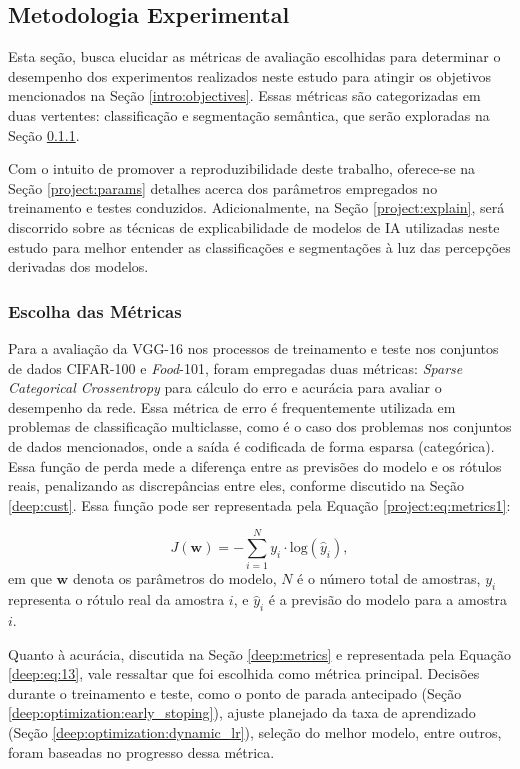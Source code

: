 \subsection{Metodologia Experimental}
\label{project:exp_result}
Esta seção, busca elucidar as métricas de avaliação escolhidas para determinar o desempenho dos experimentos realizados neste estudo para atingir os objetivos mencionados na Seção \ref{intro:objectives}. Essas métricas são categorizadas em duas vertentes: classificação e segmentação semântica, que serão exploradas na Seção \ref{project:metrics}.

Com o intuito de promover a reproduzibilidade deste trabalho, oferece-se na Seção \ref{project:params} detalhes acerca dos parâmetros empregados no treinamento e testes conduzidos. Adicionalmente, na Seção \ref{project:explain}, será discorrido sobre as técnicas de explicabilidade de modelos de IA utilizadas neste estudo para melhor entender as classificações e segmentações à luz das percepções derivadas dos modelos.

\subsubsection{Escolha das Métricas}
\label{project:metrics}
Para a avaliação da VGG-16 nos processos de treinamento e teste nos conjuntos de dados CIFAR-100 e \textit{Food}-101, foram empregadas duas métricas: \textit{Sparse Categorical Crossentropy} para cálculo do erro e acurácia para avaliar o desempenho da rede. Essa métrica de erro é frequentemente utilizada em problemas de classificação multiclasse, como é o caso dos problemas nos conjuntos de dados mencionados, onde a saída é codificada de forma esparsa (categórica). Essa função de perda mede a diferença entre as previsões do modelo e os rótulos reais, penalizando as discrepâncias entre eles, conforme discutido na Seção \ref{deep:cust}. Essa função pode ser representada pela Equação \ref{project:eq:metrics1}:

\begin{equation}
    \label{project:eq:metrics1}
    J(\boldsymbol{w}) = - \sum_{i=1}^{N} y_i \cdot \text{log}(\hat{y}_i),
\end{equation}
em que $\boldsymbol{w}$ denota os parâmetros do modelo, $N$ é o número total de amostras, $y_i$ representa o rótulo real da amostra $i$, e $\hat{y}_i$ é a previsão do modelo para a amostra $i$.

Quanto à acurácia, discutida na Seção \ref{deep:metrics} e representada pela Equação \ref{deep:eq:13}, vale ressaltar que foi escolhida como métrica principal. Decisões durante o treinamento e teste, como o ponto de parada antecipado (Seção \ref{deep:optimization:early_stoping}), ajuste planejado da taxa de aprendizado (Seção \ref{deep:optimization:dynamic_lr}), seleção do melhor modelo, entre outros, foram baseadas no progresso dessa métrica.

